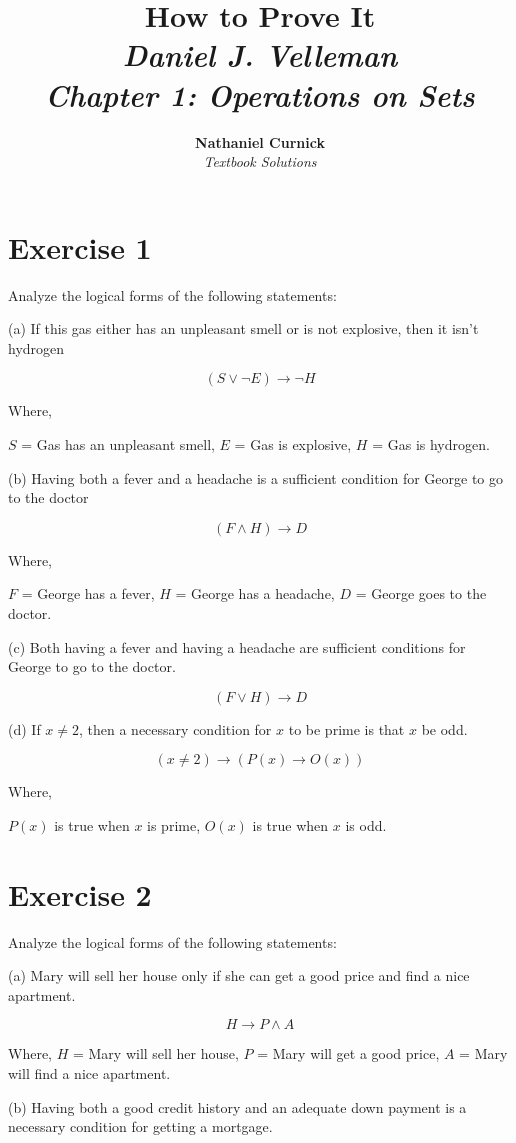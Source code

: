 \documentclass[11pt]{article}
\title{\textbf{How to Prove It} \\ {\Large\itshape Daniel J. Velleman} \\ {\Large\itshape Chapter 1: Operations on Sets}}
\author{\textbf{Nathaniel Curnick} \\ \textit{Textbook Solutions}}
\date{}
\newcommand{\then}{\rightarrow}
\begin{document}
\maketitle

\section*{Exercise 1}

Analyze the logical forms of the following statements:

\noindent (a) If this gas either has an unpleasant smell or is not explosive, 
then it isn't hydrogen

$$(S \vee \neg E) \then \neg H$$

Where,

$S$ = Gas has an unpleasant smell,
$E$ = Gas is explosive,
$H$ = Gas is hydrogen.

\noindent (b) Having both a fever and a headache is a sufficient condition for 
George to go to the doctor

$$(F \wedge H) \then D$$

Where,

$F$ = George has a fever,
$H$ = George has a headache,
$D$ = George goes to the doctor.

\noindent (c) Both having a fever and having a headache are sufficient conditions
for George to go to the doctor.

$$(F \vee H) \then D$$

\noindent (d) If $x \neq 2$, then a necessary condition for $x$ to be prime is that
$x$ be odd.

$$(x \neq 2) \then (P(x) \then O(x))$$

Where,

$P(x)$ is true when $x$ is prime,
$O(x)$ is true when $x$ is odd.

\section*{Exercise 2}

Analyze the logical forms of the following statements:

\noindent (a) Mary will sell her house only if she can get a good price and find a
nice apartment.

$$H \then P \wedge A$$

Where,
$H$ = Mary will sell her house,
$P$ = Mary will get a good price,
$A$ = Mary will find a nice apartment.

\noindent (b) Having both a good credit history and an adequate down payment is a
necessary condition for getting a mortgage.
\end{document}
